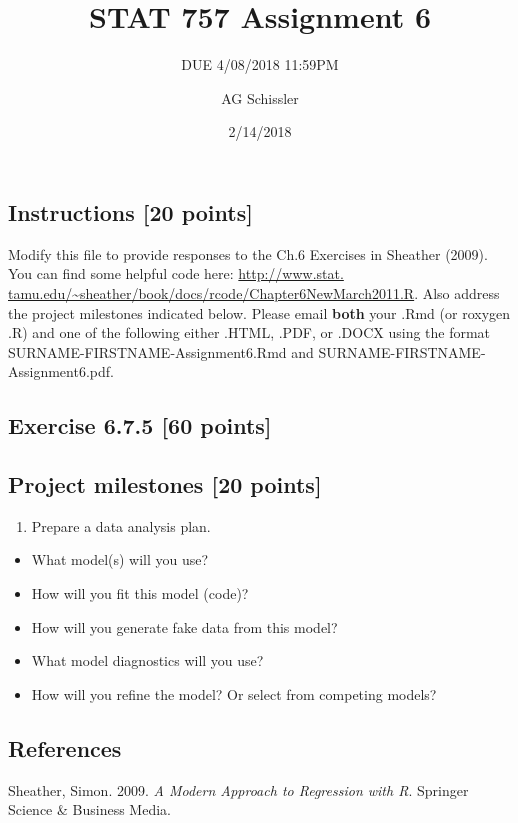 \documentclass[]{article}
\title{STAT 757 Assignment 6}
\subtitle{DUE 4/08/2018 11:59PM}
\author{AG Schissler}
\date{2/14/2018}
\providecommand{\tightlist}{%
  \setlength{\itemsep}{0pt}\setlength{\parskip}{0pt}}
\begin{document}
\maketitle

\hypertarget{instructions-20-points}{%
\subsection{Instructions {[}20 points{]}}\label{instructions-20-points}}

Modify this file to provide responses to the Ch.6 Exercises in Sheather
(2009). You can find some helpful code here:
\href{http://www.stat.tamu.edu/~sheather/book/docs/rcode/Chapter6NewMarch2011.R}{http://www.stat.
tamu.edu/\textasciitilde{}sheather/book/docs/rcode/Chapter6NewMarch2011.R}.
Also address the project milestones indicated below. Please email
\textbf{both} your .Rmd (or roxygen .R) and one of the following either
.HTML, .PDF, or .DOCX using the format SURNAME-FIRSTNAME-Assignment6.Rmd
and SURNAME-FIRSTNAME-Assignment6.pdf.

\hypertarget{exercise-6.7.5-60-points}{%
\subsection{Exercise 6.7.5 {[}60
points{]}}\label{exercise-6.7.5-60-points}}

\hypertarget{project-milestones-20-points}{%
\subsection{Project milestones {[}20
points{]}}\label{project-milestones-20-points}}

\begin{enumerate}
\def\labelenumi{\arabic{enumi}.}
\tightlist
\item
  Prepare a data analysis plan.
\end{enumerate}

\begin{itemize}
\tightlist
\item
  What model(s) will you use?
\item
  How will you fit this model (code)?
\item
  How will you generate fake data from this model?
\item
  What model diagnostics will you use?
\item
  How will you refine the model? Or select from competing models?
\end{itemize}

\hypertarget{references}{%
\subsection*{References}\label{references}}

\hypertarget{refs}{}
\leavevmode\hypertarget{ref-sheather2009}{}%
Sheather, Simon. 2009. \emph{A Modern Approach to Regression with R}.
Springer Science \& Business Media.
\end{document}

